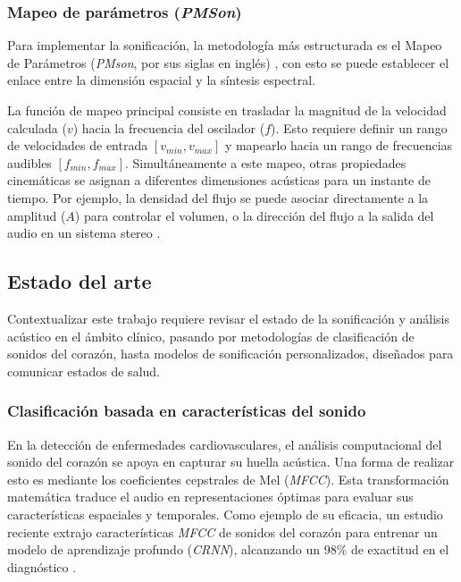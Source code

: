 \subsubsection{Mapeo de parámetros (\textit{PMSon})}

Para implementar la sonificación, la metodología más estructurada es el Mapeo de Parámetros (\textit{PMson}, por sus siglas en inglés) \cite{hermann2011sonification}, con esto se puede establecer el enlace entre la dimensión espacial y la síntesis espectral.

La función de mapeo principal consiste en trasladar la magnitud de la velocidad calculada ($v$) hacia la frecuencia del oscilador ($f$). Esto requiere definir un rango de velocidades de entrada $[v_{min}, v_{max}]$ y mapearlo hacia un rango de frecuencias audibles $[f_{min}, f_{max}]$. Simultáneamente a este mapeo, otras propiedades cinemáticas se asignan a diferentes dimensiones acústicas para un instante de tiempo. Por ejemplo, la densidad del flujo se puede asociar directamente a la amplitud ($A$) para controlar el volumen, o la dirección del flujo a la salida del audio en un sistema stereo \cite{dubus2013systematic}.

\subsection{Estado del arte}

Contextualizar este trabajo requiere revisar el estado de la sonificación y análisis acústico en el ámbito clínico, pasando por metodologías de clasificación de sonidos del corazón, hasta modelos de sonificación personalizados, diseñados para comunicar estados de salud.

\subsubsection{Clasificación basada en características del sonido}

En la detección de enfermedades cardiovasculares, el análisis computacional del sonido del corazón se apoya en capturar su huella acústica. Una forma de realizar esto es mediante los coeficientes cepstrales de Mel (\textit{MFCC}). Esta transformación matemática traduce el audio en representaciones óptimas para evaluar sus características espaciales y temporales. Como ejemplo de su eficacia, un estudio reciente extrajo características \textit{MFCC} de sonidos del corazón para entrenar un modelo de aprendizaje profundo (\textit{CRNN}), alcanzando un 98\% de exactitud en el diagnóstico \cite{DENG202022}.

